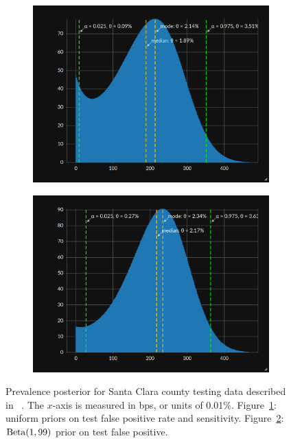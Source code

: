 \documentclass[dvipdfmx]{article}
\begin{document}
\begin{figure}
  \begin{subfigure}{0.5\textwidth}
    \centering
    \includegraphics[width=0.97\linewidth,natwidth=1280,natheight=960]{uniform.png}
    \caption{}
    \label{fig:sc_ppp}
  \end{subfigure}%
  \begin{subfigure}{0.5\textwidth}
    \centering
    \includegraphics[width=0.97\linewidth,natwidth=1280,natheight=960]{informative.png}
    \caption{}
    \label{fig:sc_inform}
  \end{subfigure}
  \caption{Prevalence posterior for Santa Clara county testing data
    described in ~\cite{Bendavid2020.04.14.20062463}. The $x$-axis is
    measured in bps, or units of 0.01\%. Figure~\ref{fig:sc_ppp}:
    uniform priors on test false positive rate and sensitivity.
    Figure~\ref{fig:sc_inform}: $\operatorname{Beta}(1,99)$ prior on test false
    positive.}
  \label{fig:posterior}
\end{figure}
\end{document}
